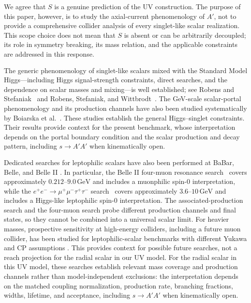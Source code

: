 \documentclass[12pt,a4paper]{article}
\begin{document}
We agree that \(S\) is a genuine prediction of the UV construction. The purpose of this paper, however, is to study the axial-current phenomenology of \(A'\), not to provide a comprehensive collider analysis of every singlet-like scalar realization. This scope choice does not mean that \(S\) is absent or can be arbitrarily decoupled; its role in symmetry breaking, its mass relation, and the applicable constraints are addressed in this response.

The generic phenomenology of singlet-like scalars mixed with the Standard Model Higgs—including Higgs signal-strength constraints, direct searches, and the dependence on scalar masses and mixing—is well established; see Robens and Stefaniak~\cite{Robens:2015singlet} and Robens, Stefaniak, and Wittbrodt~\cite{Robens:2020twoSinglets}. The GeV-scale scalar-portal phenomenology and its production channels have also been studied systematically by Boiarska et al.~\cite{Boiarska:2019scalarPortal}. These studies establish the general Higgs--singlet constraints. Their results provide context for the present benchmark, whose interpretation depends on the portal boundary condition and the scalar production and decay pattern, including \(s\to A'A'\) when kinematically open.

Dedicated searches for leptophilic scalars have also been performed at BaBar, Belle, and Belle II \cite{BaBar:2020jma,Belle:2022gbl,Belle-II:2024wtd,Belle-II:2023ydz}. In particular, the Belle II four-muon resonance search~\cite{Belle-II:2024wtd} covers approximately \(0.212\text{--}9.0\,\mathrm{GeV}\) and includes a muonphilic spin-0 interpretation, while the \(e^+e^-\to\mu^+\mu^-\tau^+\tau^-\) search~\cite{Belle-II:2023ydz} covers approximately \(3.6\text{--}10\,\mathrm{GeV}\) and includes a Higgs-like leptophilic spin-0 interpretation. The associated-production search and the four-muon search probe different production channels and final states, so they cannot be combined into a universal scalar limit. For heavier masses, prospective sensitivity at high-energy colliders, including a future muon collider, has been studied for leptophilic-scalar benchmarks with different Yukawa and CP assumptions \cite{Chen:2021leptophilic}. This provides context for possible future searches, not a reach projection for the radial scalar in our UV model. For the radial scalar in this UV model, these searches establish relevant mass coverage and production channels rather than model-independent exclusions: the interpretation depends on the matched coupling normalization, production rate, branching fractions, widths, lifetime, and acceptance, including \(s\to A'A'\) when kinematically open.
\end{document}
